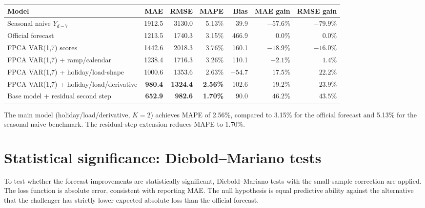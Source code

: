 \documentclass[10pt,a4paper]{article}
\begin{document}
\begin{center}
\fontsize{8.0}{9.4}\selectfont
\begin{tabular}{p{}rrrrrr}
\toprule
Model & MAE & RMSE & MAPE & Bias & MAE gain & RMSE gain\\
\midrule
Seasonal naive \(Y_{d-7}\)                        & 1912.5 & 3130.0 & 5.13\% &   39.9 & \(-57.6\%\) & \(-79.9\%\)\\
Official forecast                                  & 1213.5 & 1740.3 & 3.15\% &  466.9 & \phantom{-}0.0\% & \phantom{-}0.0\%\\
\midrule
FPCA VAR(1,7) scores                               & 1442.6 & 2018.3 & 3.76\% &  160.1 & \(-18.9\%\) & \(-16.0\%\)\\
FPCA VAR(1,7) + ramp/calendar                      & 1238.4 & 1716.3 & 3.26\% &  110.1 &  \(-2.1\%\) & \(\phantom{-}1.4\%\)\\
FPCA VAR(1,7) + holiday/load-shape                 & 1000.6 & 1353.6 & 2.63\% &  \(-54.7\) & \(17.5\%\) & \(22.2\%\)\\
FPCA VAR(1,7) + holiday/load/derivative            & \textbf{980.4} & \textbf{1324.4} & \textbf{2.56\%} &  102.6 & \(\mathbf{19.2\%}\) & \(\mathbf{23.9\%}\)\\
\midrule
Base model + residual second step                  & \textbf{652.9} & \textbf{982.6} & \textbf{1.70\%} &  90.0 & \(\mathbf{46.2\%}\) & \(\mathbf{43.5\%}\)\\
\bottomrule
\end{tabular}
\end{center}

\fontsize{9.2}{10.8}\selectfont

\noindent The main model (holiday/load/derivative, \(K=2\)) achieves MAPE of 2.56\%, compared to 3.15\% for the official forecast and 5.13\% for the seasonal naive benchmark. The residual-step extension reduces MAPE to 1.70\%.

\section*{Statistical significance: Diebold--Mariano tests}

To test whether the forecast improvements are statistically significant, Diebold--Mariano tests \citep{diebold_mariano_1995} with the \citet{harvey_etal_1997} small-sample correction are applied. The loss function is absolute error, consistent with reporting MAE. The null hypothesis is equal predictive ability against the alternative that the challenger has strictly lower expected absolute loss than the official forecast.
\end{document}
